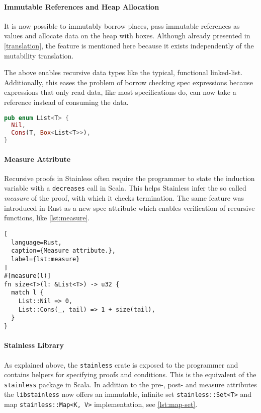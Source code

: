 \paragraph{Immutable References and Heap Allocation}

It is now possible to immutably borrow places, pass immutable references as
values and allocate data on the heap with boxes. Although already presented in
\autoref{translation}, the feature is mentioned here because it exists
independently of the mutability translation.

The above enables recursive data types like the typical, functional linked-list.
Additionally, this eases the problem of borrow checking spec expressions because
expressions that only read data, like most specifications do, can now take a
reference instead of consuming the data.

\begin{lstlisting}[language=Rust, style=short]
pub enum List<T> {
  Nil,
  Cons(T, Box<List<T>>),
}
\end{lstlisting}

\paragraph{Measure Attribute}

Recursive proofs in Stainless often require the programmer to state the
induction variable with a \lstinline!decreases! call in Scala. This helps
Stainless infer the so called \emph{measure} of the proof, with which it checks
termination. The same feature was introduced in Rust as a new spec attribute
which enables verification of recursive functions, like \autoref{lst:measure}.

\begin{lstlisting}[
  language=Rust,
  caption={Measure attribute.},
  label={lst:measure}
]
#[measure(l)]
fn size<T>(l: &List<T>) -> u32 {
  match l {
    List::Nil => 0,
    List::Cons(_, tail) => 1 + size(tail),
  }
}
\end{lstlisting}

\paragraph{Stainless Library}

As explained above, the \lstinline!stainless! crate is exposed to the programmer
and contains helpers for specifying proofs and conditions. This is the
equivalent of the \lstinline!stainless! package in Scala. In addition to the
pre-, post- and measure attributes the \lstinline!libstainless! now offers an
immutable, infinite set \passthrough{\lstinline!stainless::Set<T>!} and map
\passthrough{\lstinline!stainless::Map<K, V>!} implementation, see
\autoref{lst:map-set}.


